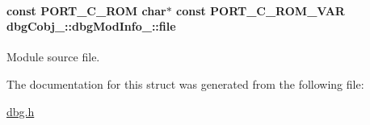 \hypertarget{structdbgCobj___1_1dbgModInfo___ac3336d552e586c2d91a044ccdcc40764}{
\paragraph[{file}]{\setlength{\rightskip}{0pt plus 5cm}const P\-O\-R\-T\-\_\-\-C\-\_\-\-R\-O\-M char$\ast$ const P\-O\-R\-T\-\_\-\-C\-\_\-\-R\-O\-M\-\_\-\-V\-A\-R dbg\-Cobj\-\_\-\-::dbg\-Mod\-Info\-\_\-\-::file}}\label{structdbgCobj___1_1dbgModInfo___ac3336d552e586c2d91a044ccdcc40764}


Module source file. 



The documentation for this struct was generated from the following file\-:\begin{DoxyCompactItemize}
\item 
\hyperlink{dbg_8h}{dbg.\-h}\end{DoxyCompactItemize}
